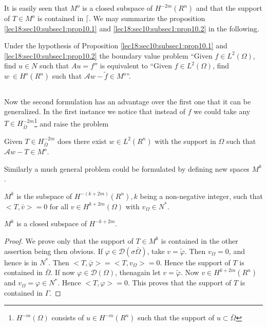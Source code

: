 It is easily seen that $M^o$ is a closed subspace of $H^{-2m} (R^n)$
and that the support of $T \in M^o$ is contained in
$\lceil$. We may summarize the proposition \ref{lec18:sec10:subsec1:prop10.1} and \ref{lec18:sec10:subsec1:prop10.2} in the following.  

\begin{theorem}\label{lec18:sec10:subsec1:thm10.1}%
  Under the hypothesis of Proposition \ref{lec18:sec10:subsec1:prop10.1} and \ref{lec18:sec10:subsec1:prop10.2} the boundary value
  problem ``Given $f \in L^2 (\Omega )$, find $u \in N$
  such that $Au = f''$ is equivalent to ``Given $f \in L^2
  (\Omega )$, find $w ~ \in H^o (R^n)$ such that $\mathscr{A} w
  - \tilde{f} \in M^o$''.  
\end{theorem}

\subsection{}\label{lec18:sec10:subsec2}

Now the second formulation has an advantage over the first one that it
can be generalized. In the first instance we notice that instead of
$f$ we could take any $T \in H^{-2m}_{\bar{\Omega}}$\footnote{$H^{-m}
  (\Omega)$ consists of $u \in H^{-m}(R^n)$ such that the support of $u \subset
  \bar{\Omega}$} and raise the problem 
\begin{problem}\label{lec18:sec10:subsec2:prob10.1}%
  Given $T \in H^{-2m}_{\bar{\Omega}}$ does there exist $w
  \in L^2 (R^n)$ with the support in $\Omega$ such that
  $\mathscr{A} w - T \in M^o$.  
\end{problem}

Similarly a much general problem could be formulated by defining new
spaces $M^k$.  
\begin{definition}\label{lec18:sec10:subsec2:def10.2}%
  $M^k$ is the subspace of $H^{-(k+2m)}(R^n), k$ being a non-negative
  integer, such that $< T, \bar{v} > = 0$ for all $v \in
  H^{k+2m} (\Omega )$ with $v_{\Omega} \in N^*$.  
\end{definition}

\begin{lemma}\label{lec18:sec10:subsec2:lem10.1}%
  $M^k$ is a closed subspace of $H^{-k + 2m}$. 
\end{lemma}

\begin{proof}
  We prove only that the support of $T \in M^k$ is contained in
  the other assertion being then obvious. If $\varphi \in
  \mathscr{D} (\sigma \bar{\Omega})$, take $v = \tilde{\varphi}$. Then
  $v_{\Omega} =0$, and hence is in $N^*$. Then $< T, \bar{\varphi} > = <
  T, v_{\Omega} > = 
  0$. Hence the support of $T$ is contained in $\bar{\Omega}$. If now
  $\varphi \in \mathscr{D} (\Omega)$,  
  then\pageoriginale again let $v = \tilde{\varphi}$. Now $v \in H^{k+2m}
  (R^n)$ and $v_{\Omega} = \varphi \in  N^*$. Hence $< T, \varphi
  > = 0$. This proves that the support of $T$ is contained in $\Gamma$.  
\end{proof}

